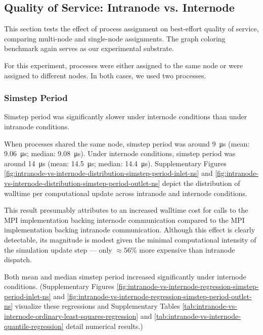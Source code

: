 \subsection{Quality of Service: Intranode vs. Internode}
\label{sec:intranode-vs-internode}

This section tests the effect of process assignment on best-effort quality of service, comparing multi-node and single-node assignments.
The graph coloring benchmark again serves as our experimental substrate.

For this experiment, processes were either assigned to the same node or were assigned to different nodes.
In both cases, we used two processes.

\subsubsection{Simstep Period}

Simstep period was significantly slower under internode conditions than under intranode conditions.

When processes shared the same node, simstep period was around \SI{9}{\micro\second} (mean: \SI{9.06}{\micro\second}; median: \SI{9.08}{\micro\second}).
Under internode conditions, simstep period was around \SI{14}{\micro\second} (mean: \SI{14.5}{\micro\second}; median: \SI{14.4}{\micro\second}).
Supplementary Figures \ref{fig:intranode-vs-internode-distribution-simstep-period-inlet-ns} and \ref{fig:intranode-vs-internode-distribution-simstep-period-outlet-ns} depict the distribution of walltime per computational update across intranode and internode conditions.

This result presumably attributes to an increased walltime cost for calls to the MPI implementation backing internode communication compared to the MPI implementation backing intranode communication.
Although this effect is clearly detectable, its magnitude is modest given the minimal computational intensity of the simulation update step --- only $\approx 56\%$ more expensive than intranode dispatch.

Both mean and median simstep period increased significantly under internode conditions.
(Supplementary Figures \ref{fig:intranode-vs-internode-regression-simstep-period-inlet-ns} and \ref{fig:intranode-vs-internode-regression-simstep-period-outlet-ns} visualize these regressions and Supplementary Tables \ref{tab:intranode-vs-internode-ordinary-least-squares-regression} and \ref{tab:intranode-vs-internode-quantile-regression} detail numerical results.)

